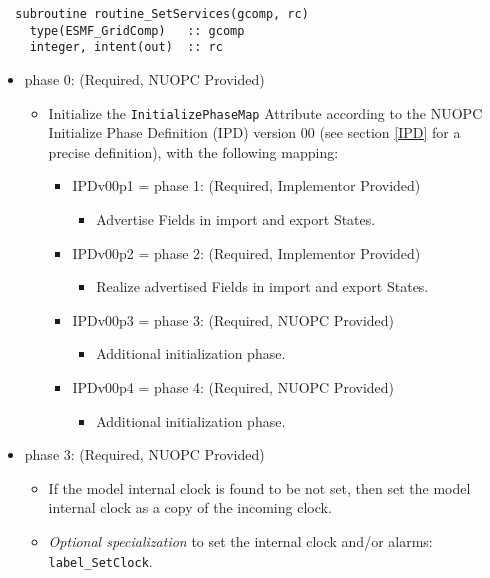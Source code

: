 \begin{verbatim}  subroutine routine_SetServices(gcomp, rc)
    type(ESMF_GridComp)   :: gcomp
    integer, intent(out)  :: rc
\end{verbatim}

\begin{itemize}
\item phase 0: ({\sc Required, NUOPC Provided})
  \begin{itemize}
  \item Initialize the {\tt InitializePhaseMap} Attribute according to the NUOPC Initialize Phase Definition (IPD) version 00 (see section \ref{IPD} for a precise definition), with the following mapping:
    \begin{itemize}
    \item IPDv00p1 = phase 1: ({\sc Required, Implementor Provided})
      \begin{itemize}
      \item Advertise Fields in import and export States.
      \end{itemize}
    \item IPDv00p2 = phase 2: ({\sc Required, Implementor Provided})
      \begin{itemize}
      \item Realize advertised Fields in import and export States.
      \end{itemize}  
    \item IPDv00p3 = phase 3: ({\sc Required, NUOPC Provided})
      \begin{itemize}
      \item Additional initialization phase.
      \end{itemize}
    \item IPDv00p4 = phase 4: ({\sc Required, NUOPC Provided})
      \begin{itemize}
      \item Additional initialization phase.
      \end{itemize}
    \end{itemize}  
  \end{itemize}  
\item phase 3: ({\sc Required, NUOPC Provided})
  \begin{itemize}
  \item If the model internal clock is found to be not set, then set the model internal clock as a copy of the incoming clock. 
  \item {\it Optional specialization} to set the internal clock and/or alarms: {\tt label\_SetClock}.

\end{itemize}
\end{itemize}
